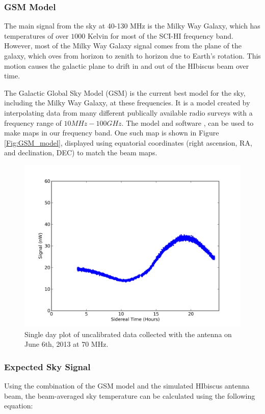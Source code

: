 \subsubsection{GSM Model}\label{Sec:GSM}

The main signal from the sky at 40-130 MHz is the Milky Way Galaxy, which has temperatures of over $1000$ Kelvin for most of the SCI-HI frequency band. However, most of the Milky Way Galaxy signal comes from the plane of the galaxy, which oves from horizon to zenith to horizon due to Earth's rotation. This motion causes the galactic plane to drift in and out of the HIbiscus beam over time. 


The Galactic Global Sky Model (GSM) is the current best model for the sky, including the Milky Way Galaxy, at these frequencies. It is a model created by interpolating data from many different publically available radio surveys with a frequency range of $10 MHz - 100 GHz$. The model and software \cite{GSM_model}, can be used to make maps in our frequency band. One such map is shown in Figure \ref{Fig:GSM_model}, displayed using equatorial coordinates (right ascension, RA, and declination, DEC) to match the beam maps. 

\begin{figure}[htb]
\begin{center}
\includegraphics[width=0.9\linewidth]{Data_analysis/figures/June_06_time_series_uncal_70mhz.png}
\caption{Single day plot of uncalibrated data collected with the antenna on June 6th, 2013 at 70 MHz.}
\label{Fig:raw_time_series}
\end{center}
\end{figure}

\subsubsection{Expected Sky Signal}
Using the combination of the GSM model and the simulated HIbiscus antenna beam, the beam-averaged sky temperature can be calculated using the following equation: 

